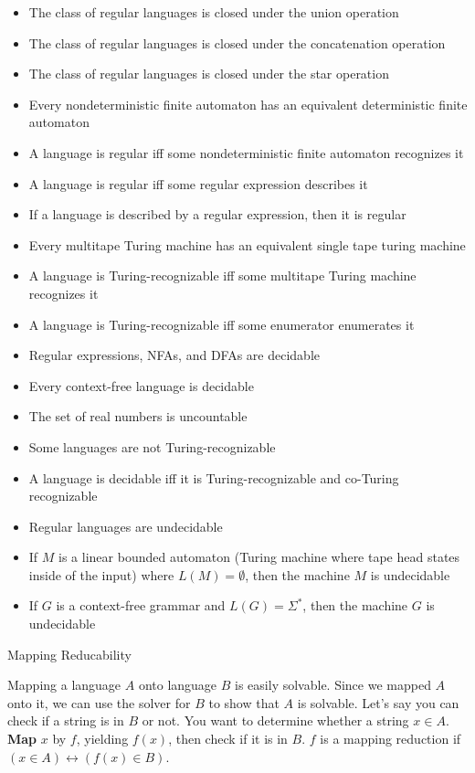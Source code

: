 \documentclass[2pt]{scrartcl}
\makeatletter
\renewcommand{\section}{\@startsection{section}{1}{0mm}
  {-1ex plus -.5ex minus -.2ex}
  {0.5ex plus .2ex}
{\normalfont\large\bfseries}}
\makeatother
\begin{document}
\begin{multicols}{6}
  \begin{itemize}
    \item The class of regular languages is closed under the union operation
    \item The class of regular languages is closed under the concatenation operation
    \item The class of regular languages is closed under the star operation
    \item Every nondeterministic finite automaton has an equivalent deterministic finite automaton
    \item A language is regular iff some nondeterministic finite automaton recognizes it
    \item A language is regular iff some regular expression describes it
    \item If a language is described by a regular expression, then it is regular
    \item Every multitape Turing machine has an equivalent single tape turing machine
    \item A language is Turing-recognizable iff some multitape Turing machine recognizes it
    \item A language is Turing-recognizable iff some enumerator enumerates it
    \item Regular expressions, NFAs, and DFAs are decidable
    \item Every context-free language is decidable
    \item The set of real numbers is uncountable
    \item Some languages are not Turing-recognizable
    \item A language is decidable iff it is Turing-recognizable and co-Turing recognizable
    \item Regular languages are undecidable
    \item If $M$ is a linear bounded automaton (Turing machine where tape head states inside of the input) where $L(M) = \emptyset$, then the machine $M$ is undecidable
    \item If $G$ is a context-free grammar and $L(G) = \Sigma^*$, then the machine $G$ is undecidable
  \end{itemize}

  \section{Mapping Reducability}

  Mapping a language $A$ onto language $B$ is easily solvable. Since we mapped $A$ onto it, we can use the solver for $B$ to show that $A$ is solvable. Let's say you can check if a string is in $B$ or not. You want to determine whether a string $x \in A$. {\bf Map} $x$ by $f$, yielding $f(x)$, then check if it is in $B$. $f$ is a mapping reduction if $(x \in A) \leftrightarrow (f(x) \in B)$.


\end{multicols}
\end{document}
